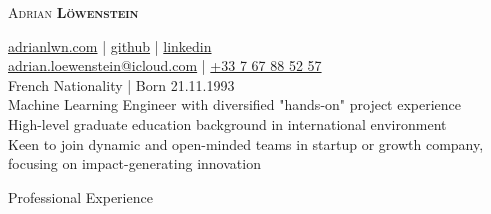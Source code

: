\documentclass{article}
\newcommand{\namesection}[4]{
	\begin{center}
		\sffamily \color{headings}
		\headingfont\fontsize{35pt}{14pt}\selectfont\scshape #1 
			\headingfont\selectfont\scshape\bfseries #2
	\end{center}
	\vspace{-14pt}
		\begin{center} \color{subheadings}\normalfont\fontsize{11pt}{14pt}\selectfont #3
		\end{center}
	
	\vspace{-5pt}
	}
\begin{document}

\namesection{Adrian}{Löwenstein}{\href{https://www.adrianlwn.com}{\faGlobe{} adrianlwn.com} | \href{https://github.com/adrianlwn}{\faGithubSquare{}  github}  | \href{https://www.linkedin.com/in/adrianloewenstein}{\faLinkedinSquare{}  linkedin} \\ \href{mailto:adrian.loewenstein@icloud.com}{\faEnvelope{} adrian.loewenstein@icloud.com} |  \href{tel:+33767885257}{\faPhoneSquare{} +33 7 67 88 52 57}  \\ French Nationality | Born 21.11.1993 \\[10pt] Machine Learning Engineer with diversified "hands-on" project experience\\ High-level graduate education background in international environment\\ Keen to join dynamic and open-minded teams in startup or growth company, \\ focusing on impact-generating innovation}

\section{Professional Experience}
\end{document}
